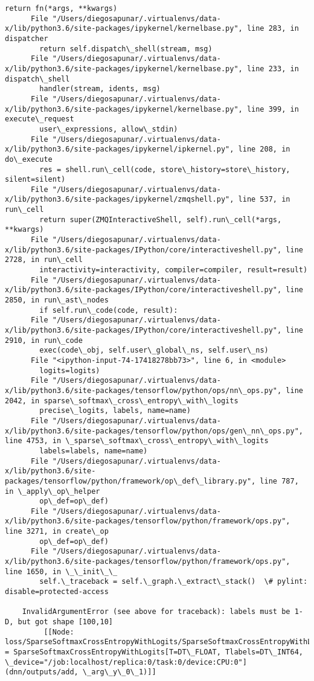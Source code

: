 \documentclass[11pt]{article}
\begin{document}
\begin{Verbatim}[commandchars=\\\{\}]
        return fn(*args, **kwargs)
      File "/Users/diegosapunar/.virtualenvs/data-x/lib/python3.6/site-packages/ipykernel/kernelbase.py", line 283, in dispatcher
        return self.dispatch\_shell(stream, msg)
      File "/Users/diegosapunar/.virtualenvs/data-x/lib/python3.6/site-packages/ipykernel/kernelbase.py", line 233, in dispatch\_shell
        handler(stream, idents, msg)
      File "/Users/diegosapunar/.virtualenvs/data-x/lib/python3.6/site-packages/ipykernel/kernelbase.py", line 399, in execute\_request
        user\_expressions, allow\_stdin)
      File "/Users/diegosapunar/.virtualenvs/data-x/lib/python3.6/site-packages/ipykernel/ipkernel.py", line 208, in do\_execute
        res = shell.run\_cell(code, store\_history=store\_history, silent=silent)
      File "/Users/diegosapunar/.virtualenvs/data-x/lib/python3.6/site-packages/ipykernel/zmqshell.py", line 537, in run\_cell
        return super(ZMQInteractiveShell, self).run\_cell(*args, **kwargs)
      File "/Users/diegosapunar/.virtualenvs/data-x/lib/python3.6/site-packages/IPython/core/interactiveshell.py", line 2728, in run\_cell
        interactivity=interactivity, compiler=compiler, result=result)
      File "/Users/diegosapunar/.virtualenvs/data-x/lib/python3.6/site-packages/IPython/core/interactiveshell.py", line 2850, in run\_ast\_nodes
        if self.run\_code(code, result):
      File "/Users/diegosapunar/.virtualenvs/data-x/lib/python3.6/site-packages/IPython/core/interactiveshell.py", line 2910, in run\_code
        exec(code\_obj, self.user\_global\_ns, self.user\_ns)
      File "<ipython-input-74-17418278bb73>", line 6, in <module>
        logits=logits)
      File "/Users/diegosapunar/.virtualenvs/data-x/lib/python3.6/site-packages/tensorflow/python/ops/nn\_ops.py", line 2042, in sparse\_softmax\_cross\_entropy\_with\_logits
        precise\_logits, labels, name=name)
      File "/Users/diegosapunar/.virtualenvs/data-x/lib/python3.6/site-packages/tensorflow/python/ops/gen\_nn\_ops.py", line 4753, in \_sparse\_softmax\_cross\_entropy\_with\_logits
        labels=labels, name=name)
      File "/Users/diegosapunar/.virtualenvs/data-x/lib/python3.6/site-packages/tensorflow/python/framework/op\_def\_library.py", line 787, in \_apply\_op\_helper
        op\_def=op\_def)
      File "/Users/diegosapunar/.virtualenvs/data-x/lib/python3.6/site-packages/tensorflow/python/framework/ops.py", line 3271, in create\_op
        op\_def=op\_def)
      File "/Users/diegosapunar/.virtualenvs/data-x/lib/python3.6/site-packages/tensorflow/python/framework/ops.py", line 1650, in \_\_init\_\_
        self.\_traceback = self.\_graph.\_extract\_stack()  \# pylint: disable=protected-access
    
    InvalidArgumentError (see above for traceback): labels must be 1-D, but got shape [100,10]
    	 [[Node: loss/SparseSoftmaxCrossEntropyWithLogits/SparseSoftmaxCrossEntropyWithLogits = SparseSoftmaxCrossEntropyWithLogits[T=DT\_FLOAT, Tlabels=DT\_INT64, \_device="/job:localhost/replica:0/task:0/device:CPU:0"](dnn/outputs/add, \_arg\_y\_0\_1)]]


    \end{Verbatim}
\end{document}
